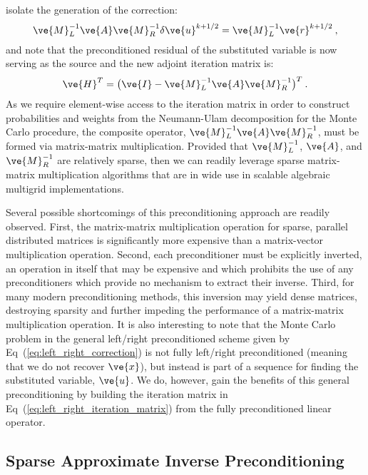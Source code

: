 \documentclass[letterpaper,11pt]{article}
\begin{document}
isolate the generation of the correction:
\begin{equation}
  \ve{M}_L^{-1}\ve{A}\ve{M}_R^{-1}\delta\ve{u}^{k+1/2} =
  \ve{M}_L^{-1}\ve{r}^{k+1/2}\:,
  \label{eq:left_right_correction}
\end{equation}
and note that the preconditioned residual of the substituted variable
is now serving as the source and the new adjoint iteration matrix is:
\begin{equation}
  \ve{H}^T = \big(\ve{I} - \ve{M}_L^{-1}\ve{A}\ve{M}_R^{-1}\big)^T\:.
  \label{eq:left_right_iteration_matrix}
\end{equation}
As we require element-wise access to the iteration matrix in order to
construct probabilities and weights from the Neumann-Ulam
decomposition for the Monte Carlo procedure, the composite operator,
$\ve{M}_L^{-1}\ve{A}\ve{M}_R^{-1}$, must be formed via matrix-matrix
multiplication. Provided that $\ve{M}_L^{-1}$, $\ve{A}$, and
$\ve{M}_R^{-1}$ are relatively sparse, then we can readily leverage
sparse matrix-matrix multiplication algorithms that are in wide use in
scalable algebraic multigrid implementations.

Several possible shortcomings of this preconditioning approach are
readily observed. First, the matrix-matrix multiplication operation
for sparse, parallel distributed matrices is significantly more
expensive than a matrix-vector multiplication operation. Second, each
preconditioner must be explicitly inverted, an operation in itself
that may be expensive and which prohibits the use of any
preconditioners which provide no mechanism to extract their
inverse. Third, for many modern preconditioning methods, this
inversion may yield dense matrices, destroying sparsity and further
impeding the performance of a matrix-matrix multiplication
operation. It is also interesting to note that the Monte Carlo problem
in the general left/right preconditioned scheme given by
Eq~(\ref{eq:left_right_correction}) is not fully left/right
preconditioned (meaning that we do not recover $\ve{x}$), but instead
is part of a sequence for finding the substituted variable,
$\ve{u}$. We do, however, gain the benefits of this general
preconditioning by building the iteration matrix in
Eq~(\ref{eq:left_right_iteration_matrix}) from the fully
preconditioned linear operator.

\subsection{Sparse Approximate Inverse Preconditioning}
\end{document}
